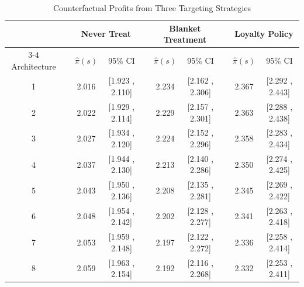 \documentclass[11pt]{article}
\numberwithin{equation}{section}
\theoremstyle{definition}
\begin{document}
\begin{table}%
	\caption{Counterfactual Profits from Three Targeting Strategies}
	\label{tab:Counterfactual-profits}
	\centering
	\begin{tabular}{cccccccccc}
		\hline
		\hline
		& & \multicolumn{2}{c}{\bfseries Never Treat} & & \multicolumn{2}{c}{\bfseries Blanket Treatment} & &  \multicolumn{2}{c}{\bfseries Loyalty Policy} \\
		\cline{3-4} \cline{6-7} \cline{9-10}
		Architecture & & $\hat{\pi}(s)$ & 95\% CI & & $\hat{\pi}(s)$ & 95\% CI & & $\hat{\pi}(s)$ & 95\% CI \\
		\hline 
		1 & & 2.016 & [1.923 , 2.110] & & 2.234 & [2.162 , 2.306] & & 2.367 & [2.292 , 2.443]  \\
		2 & & 2.022 & [1.929 , 2.114] & & 2.229 & [2.157 , 2.301] & & 2.363 & [2.288 , 2.438]  \\
		3 & & 2.027 & [1.934 , 2.120] & & 2.224 & [2.152 , 2.296] & & 2.358 & [2.283 , 2.434]  \\
		4 & & 2.037 & [1.944 , 2.130] & & 2.213 & [2.140 , 2.286] & & 2.350 & [2.274 , 2.425]  \\
		5 & & 2.043 & [1.950 , 2.136] & & 2.208 & [2.135 , 2.281] & & 2.345 & [2.269 , 2.422]  \\
		6 & & 2.048 & [1.954 , 2.142] & & 2.202 & [2.128 , 2.277] & & 2.341 & [2.263 , 2.418]  \\
		7 & & 2.053 & [1.959 , 2.148] & & 2.197 & [2.122 , 2.272] & & 2.336 & [2.258 , 2.414]  \\
		8 & & 2.059 & [1.963 , 2.154] & & 2.192 & [2.116 , 2.268] & & 2.332 & [2.253 , 2.411]  \\     
		\hline
	\end{tabular}
\end{table}
\end{document}
